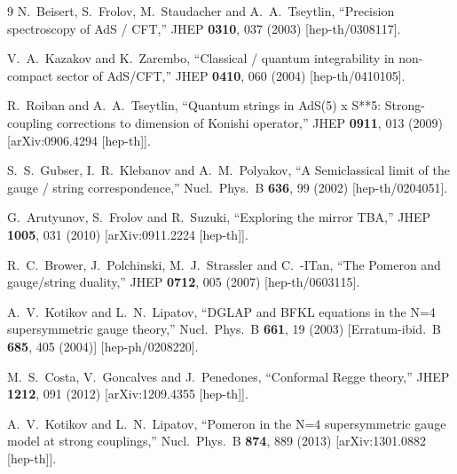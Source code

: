 \documentclass[a4paper,11pt]{article}
\numberwithin{equation}{section}
\begin{document}
\begin{thebibliography} {9}
  N.~Beisert, S.~Frolov, M.~Staudacher and A.~A.~Tseytlin,
  ``Precision spectroscopy of AdS / CFT,''
  JHEP {\bf 0310}, 037 (2003)
  [hep-th/0308117].

  V.~A.~Kazakov and K.~Zarembo,
  ``Classical / quantum integrability in non-compact sector of AdS/CFT,''
  JHEP {\bf 0410}, 060 (2004)
  [hep-th/0410105].

  R.~Roiban and A.~A.~Tseytlin,
  ``Quantum strings in AdS(5) x S**5: Strong-coupling corrections to dimension of Konishi operator,''
  JHEP {\bf 0911}, 013 (2009)
  [arXiv:0906.4294 [hep-th]].

  S.~S.~Gubser, I.~R.~Klebanov and A.~M.~Polyakov,
  ``A Semiclassical limit of the gauge / string correspondence,''
  Nucl.\ Phys.\ B {\bf 636}, 99 (2002)
  [hep-th/0204051].

  G.~Arutyunov, S.~Frolov and R.~Suzuki,
  ``Exploring the mirror TBA,''
  JHEP {\bf 1005}, 031 (2010)
  [arXiv:0911.2224 [hep-th]].

  R.~C.~Brower, J.~Polchinski, M.~J.~Strassler and C.~-ITan,
  ``The Pomeron and gauge/string duality,''
  JHEP {\bf 0712}, 005 (2007)
  [hep-th/0603115].

  A.~V.~Kotikov and L.~N.~Lipatov,
  ``DGLAP and BFKL equations in the N=4 supersymmetric gauge theory,''
  Nucl.\ Phys.\ B {\bf 661}, 19 (2003)
  [Erratum-ibid.\ B {\bf 685}, 405 (2004)]
  [hep-ph/0208220].

  M.~S.~Costa, V.~Goncalves and J.~Penedones,
  ``Conformal Regge theory,''
  JHEP {\bf 1212}, 091 (2012)
  [arXiv:1209.4355 [hep-th]].

  A.~V.~Kotikov and L.~N.~Lipatov,
  ``Pomeron in the N=4 supersymmetric gauge model at strong couplings,''
  Nucl.\ Phys.\ B {\bf 874}, 889 (2013)
  [arXiv:1301.0882 [hep-th]].


\end{thebibliography}
\end{document}
